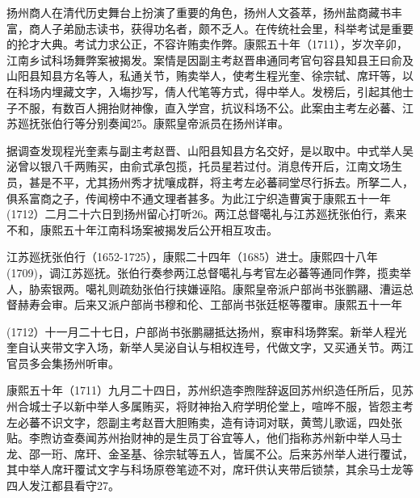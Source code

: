 
扬州商人在清代历史舞台上扮演了重要的角色，扬州人文荟萃，扬州盐商藏书丰富，商人子弟励志读书，获得功名者，颇不乏人。在传统社会里，科举考试是重要的抡才大典。考试力求公正，不容许贿卖作弊。康熙五十年（1711），岁次辛卯，江南乡试科场舞弊案被揭发。案情是因副主考赵晋串通同考官句容县知县王曰俞及山阳县知县方名等人，私通关节，贿卖举人，使考生程光奎、徐宗轼、席玕等，以在科场内埋藏文字，入塲抄写，倩人代笔等方式，得中举人。发榜后，引起其他士子不服，有数百人拥抬财神像，直入学宫，抗议科场不公。此案由主考左必蕃、江苏廵抚张伯行等分别奏闻25。康熙皇帝派员在扬州详审。

据调查发现程光奎素与副主考赵晋、山阳县知县方名交好，是以取中。中式举人吴泌曾以银八千两贿买，由俞式承包揽，托员星若过付。消息传开后，江南文场生员，甚是不平，尤其扬州秀才扰嚷成群，将主考左必蕃祠堂尽行拆去。所拏二人，俱系富商之子，传闻榜中不通文理者甚多。为此江宁织造曹寅于康熙五十一年(1712）二月二十六日到扬州留心打听26。两江总督噶礼与江苏廵抚张伯行，素来不和，康熙五十年江南科场案被揭发后公开相互攻击。

江苏廵抚张伯行（1652-1725），康熙二十四年（1685）进士。康熙四十八年(1709)，调江苏廵抚。张伯行奏参两江总督噶礼与考官左必蕃等通同作弊，揽卖举人，胁索银两。噶礼则疏劾张伯行挟嫌诬陷。康熙皇帝派户部尚书张鹏翮、漕运总督赫寿会审。后来又派户部尚书穆和伦、工部尚书张廷枢等覆审。康熙五十一年

\vfill
\begin{BookNotes}
\end{BookNotes}

\noindent (1712）十一月二十七日，户部尚书张鹏翮抵达扬州，察审科场弊案。新举人程光奎自认夹带文字入场，新举人吴泌自认与相权连号，代做文字，又买通关节。两江官员多会集扬州听审。

康熙五十年（1711）九月二十四日，苏州织造李煦陛辞返回苏州织造任所后，见苏州合城士子以新中举人多属贿买，将财神抬入府学明伦堂上，喧哗不服，皆怨主考左必蕃不识文字，怨副主考赵晋大胆贿卖，造有诗词对联，黄莺儿歌谣，四处张贴。李煦访查奏闻苏州抬财神的是生员丁谷宜等人，他们指称苏州新中举人马士龙、邵一珩、席玕、金圣基、徐宗轼等五人，皆属不公。后来苏州举人进行覆试，其中举人席玕覆试文字与科场原卷笔迹不对，席玕供认夹带后锁禁，其余马士龙等四人发江都县看守27。

